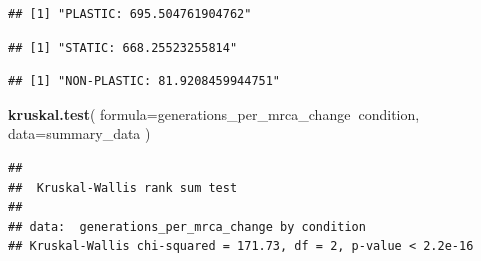 \documentclass[]{book}
\newenvironment{Shaded}{\begin{snugshade}}{\end{snugshade}}
\newcommand{\DataTypeTok}[1]{\textcolor[rgb]{0.13,0.29,0.53}{#1}}
\newcommand{\KeywordTok}[1]{\textcolor[rgb]{0.13,0.29,0.53}{\textbf{#1}}}
\newcommand{\NormalTok}[1]{#1}
\newcommand{\OperatorTok}[1]{\textcolor[rgb]{0.81,0.36,0.00}{\textbf{#1}}}
\newcommand{\StringTok}[1]{\textcolor[rgb]{0.31,0.60,0.02}{#1}}
\begin{document}
\begin{verbatim}
## [1] "PLASTIC: 695.504761904762"
\end{verbatim}

\begin{Shaded}
\end{Shaded}

\begin{verbatim}
## [1] "STATIC: 668.25523255814"
\end{verbatim}

\begin{Shaded}
\end{Shaded}

\begin{verbatim}
## [1] "NON-PLASTIC: 81.9208459944751"
\end{verbatim}

\begin{Shaded}
\begin{Highlighting}[]
\KeywordTok{kruskal.test}\NormalTok{(}
  \DataTypeTok{formula=}\NormalTok{generations_per_mrca_change}\OperatorTok{~}\NormalTok{condition,}
  \DataTypeTok{data=}\NormalTok{summary_data}
\NormalTok{)}
\end{Highlighting}
\end{Shaded}

\begin{verbatim}
## 
##  Kruskal-Wallis rank sum test
## 
## data:  generations_per_mrca_change by condition
## Kruskal-Wallis chi-squared = 171.73, df = 2, p-value < 2.2e-16
\end{verbatim}

\begin{Shaded}
\end{Shaded}
\end{document}
